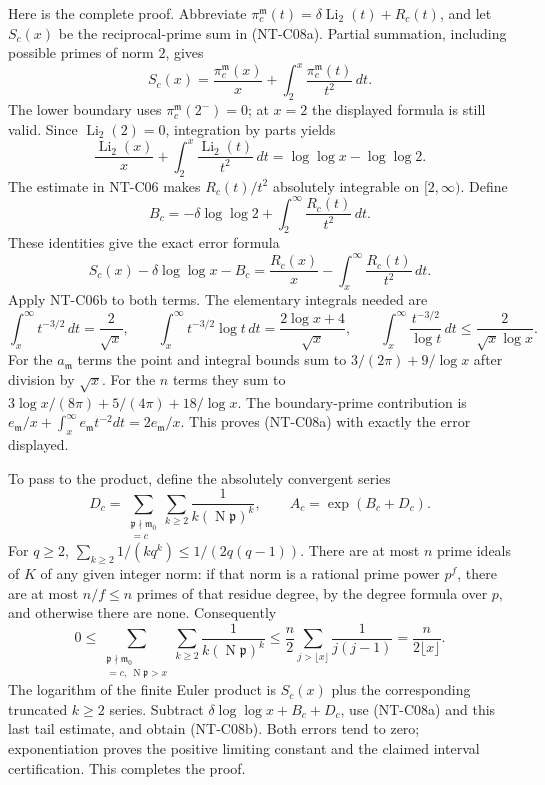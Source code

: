 \documentclass[11pt,a4paper]{article}
\begin{document}
Here is the complete proof.  Abbreviate
$\pi_c^{\mathfrak m}(t)=\delta\operatorname{Li}_2(t)+R_c(t)$,
and let $S_c(x)$ be the reciprocal-prime sum in (NT-C08a).
Partial summation, including possible primes of norm $2$, gives
\[
 S_c(x)=\frac{\pi_c^{\mathfrak m}(x)}x+
                  \int_2^x\frac{\pi_c^{\mathfrak m}(t)}{t^2}\,dt.
\]
The lower boundary uses $\pi_c^{\mathfrak m}(2^-)=0$;
at $x=2$ the displayed formula is still valid.
Since $\operatorname{Li}_2(2)=0$, integration by parts yields
\[
 \frac{\operatorname{Li}_2(x)}x+
          \int_2^x\frac{\operatorname{Li}_2(t)}{t^2}\,dt
               =\log\log x-\log\log2.
\]
The estimate in NT-C06 makes $R_c(t)/t^2$ absolutely integrable
on $[2,\infty)$.  Define
\[
 B_c=-\delta\log\log2+
                       \int_2^\infty\frac{R_c(t)}{t^2}\,dt.
\]
These identities give the exact error formula
\[
 S_c(x)-\delta\log\log x-B_c
          =\frac{R_c(x)}x-
                        \int_x^\infty\frac{R_c(t)}{t^2}\,dt.
\tag{NT-C08-tail}
\]
Apply NT-C06b to both terms.  The elementary integrals needed are
\[
 \int_x^\infty t^{-3/2}\,dt=\frac2{\sqrt x},\qquad
 \int_x^\infty t^{-3/2}\log t\,dt
                      =\frac{2\log x+4}{\sqrt x},\qquad
 \int_x^\infty\frac{t^{-3/2}}{\log t}\,dt
                      \le\frac2{\sqrt x\log x}.
\]
For the $a_{\mathfrak m}$ terms the point and integral bounds
sum to $3/(2\pi)+9/\log x$ after division by $\sqrt x$.
For the $n$ terms they sum to
$3\log x/(8\pi)+5/(4\pi)+18/\log x$.
The boundary-prime contribution is
$e_{\mathfrak m}/x+\int_x^\infty e_{\mathfrak m}t^{-2}dt
=2e_{\mathfrak m}/x$.  This proves (NT-C08a) with exactly
the error displayed.

To pass to the product, define the absolutely convergent series
\[
 D_c=\sum_{\substack{\mathfrak p\nmid\mathfrak m_0\\
                         [\mathfrak p]=c}}
                 \sum_{k\ge2}\frac1{k(\operatorname N\mathfrak p)^k},
 \qquad A_c=\exp(B_c+D_c).
\]
For $q\ge2$,
$\sum_{k\ge2}1/(kq^k)\le1/(2q(q-1))$.
There are at most $n$ prime ideals of $K$ of any given
integer norm: if that norm is a rational prime power $p^f$,
there are at most $n/f\le n$ primes of that residue degree,
by the degree formula over $p$, and otherwise there are none.
Consequently
\[
 0\le\sum_{\substack{\mathfrak p\nmid\mathfrak m_0\\
              [\mathfrak p]=c,\ \operatorname N\mathfrak p>x}}
            \sum_{k\ge2}\frac1{k(\operatorname N\mathfrak p)^k}
 \le\frac n2\sum_{j>\lfloor x\rfloor}\frac1{j(j-1)}
 =\frac{n}{2\lfloor x\rfloor}.
\]
The logarithm of the finite Euler product is $S_c(x)$ plus
the corresponding truncated $k\ge2$ series.  Subtract
$\delta\log\log x+B_c+D_c$, use (NT-C08a) and this last
tail estimate, and obtain (NT-C08b).  Both errors tend to zero;
exponentiation proves the positive limiting constant and the
claimed interval certification.  This completes the proof.
\end{document}
